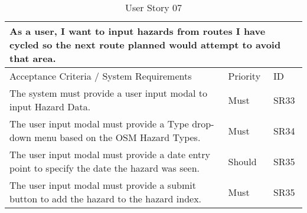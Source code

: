 \begin{table}[!htb]
\caption{User Story 07}
\label{tab:user-story-07}
\begin{tabular}{ p{11cm} p{1cm}  p{1cm} }
\hline
\multicolumn{3}{p{13cm}}{As a user, I want to input hazards from routes I have cycled so the next route planned would attempt to avoid that area.}\\ 
\hline
Acceptance Criteria / System Requirements & Priority & ID\\
\hline
The system must provide a user input modal to input Hazard Data. & Must & SR33 \\
The user input modal must provide a Type drop-down menu based on the OSM Hazard Types. & Must & SR34\\
The user input modal must provide a date entry point to specify the date the hazard was seen. & Should & SR35\\
The user input modal must provide a submit button to add the hazard to the hazard index. & Must & SR35\\ 
\hline
\end{tabular}
\end{table}